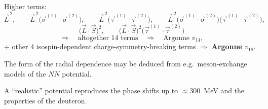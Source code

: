 \documentclass[11pt,a4paper]{article}
\begin{document}
Higher terms:
\[
\vec L^{\,2},\qquad
\vec L^{\,2}\big(\vec\sigma^{(1)}\!\cdot\vec\sigma^{(2)}\big),\qquad
\vec L^{\,2}\big(\vec\tau^{(1)}\!\cdot\vec\tau^{(2)}\big),\qquad
\vec L^{\,2}\big(\vec\sigma^{(1)}\!\cdot\vec\sigma^{(2)}\big)\big(\vec\tau^{(1)}\!\cdot\vec\tau^{(2)}\big),
\]
\[
\big(\vec L\cdot\vec S\big)^2,\qquad
\big(\vec L\cdot\vec S\big)^2\big(\vec\tau^{(1)}\!\cdot\vec\tau^{(2)}\big)
\]
\[
\Rightarrow\quad\text{altogether 14 terms}\quad\Rightarrow\quad\text{Argonne } v_{14},
\]
$+$ other 4 isospin-dependent charge-symmetry-breaking terms $\Rightarrow$ \textbf{Argonne $v_{18}$}.

The form of the radial dependence may be deduced from e.g.\ meson-exchange
models of the $NN$ potential.

A ``realistic'' potential reproduces the phase shifts up to $\approx300$~MeV
and the properties of the deuteron.
\end{document}

